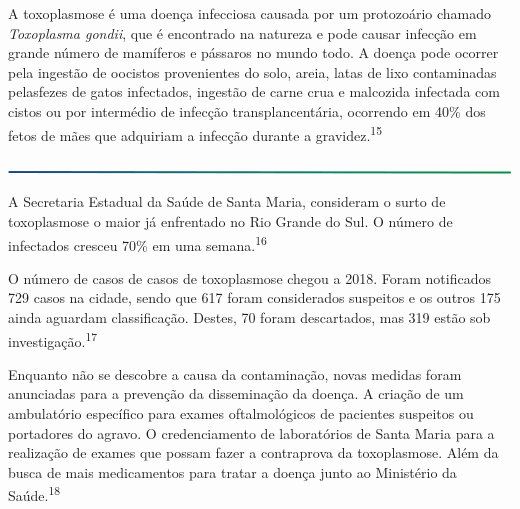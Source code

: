 \documentclass{article}
\begin{document}
  {\large %
  

    A toxoplasmose é uma doença infecciosa causada por um protozoário chamado \textit{Toxoplasma gondii}, que é encontrado na natureza e pode causar infecção em grande número de mamíferos e pássaros no mundo todo. A doença pode ocorrer pela ingestão de oocistos provenientes do solo, areia, latas de lixo contaminadas pelasfezes de gatos infectados, ingestão de carne crua e malcozida infectada com cistos ou por intermédio de infecção transplancentária, ocorrendo em 40\% dos fetos de mães que adquiriam a infecção durante a gravidez.\textsuperscript{15}

\includegraphics[width=\linewidth]{divisoria_horizontal.png} %

A Secretaria Estadual da Saúde de Santa Maria, consideram o surto de toxoplasmose o maior já enfrentado no Rio Grande do Sul. O número de infectados cresceu 70\% em uma semana.\textsuperscript{16}

O número de casos de casos de toxoplasmose chegou a 2018. Foram notificados 729 casos na cidade, sendo que 617 foram considerados suspeitos e os outros 175 ainda aguardam classificação. Destes, 70 foram descartados, mas 319 estão sob investigação.\textsuperscript{17}

Enquanto não se descobre a causa da contaminação, novas medidas foram anunciadas para a prevenção da disseminação da doença. A criação de um ambulatório específico para exames oftalmológicos de pacientes suspeitos ou portadores do agravo. O credenciamento de laboratórios de Santa Maria para a realização de exames que possam fazer a contraprova da toxoplasmose. Além da busca de mais medicamentos para tratar a doença junto ao Ministério da Saúde.\textsuperscript{18}

} %
\end{document}
